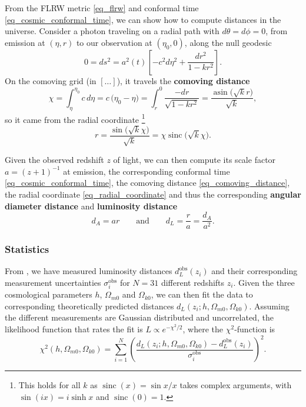 \documentclass[10pt,a4paper]{article}
\DeclareMathOperator{\asin}{asin}
\DeclareMathOperator{\sinc}{sinc}
\begin{document}
From the FLRW metric \eqref{eq_flrw} and conformal time \eqref{eq_cosmic_conformal_time},
we can show how to compute distances in the universe.
Consider a photon traveling on a radial path with $d\theta = d\phi = 0$,
from emission at $(\eta,r)$ to our observation at $(\eta_0, 0)$,
along the null geodesic
\begin{equation*}
	0 = ds^2 = a^2(t) \left[ -c^2 d\eta^2 + \frac{dr^2}{1-kr^2} \right].
\end{equation*}
On the comoving grid (in $[\ldots]$), it travels the \textbf{comoving distance}
\begin{equation}
	\chi = \int_{\eta}^{\eta_0} c \, d\eta = c \, \big(\eta_0 - \eta\big) = \int_r^0 \frac{-dr}{\sqrt{1-kr^2}} = \frac{\asin\big(\sqrt{k}r\big)}{\sqrt{k}},
\label{eq_comoving_distance}
\end{equation}
so it came from the radial coordinate%
\footnote{This holds for all $k$ as $\sinc(x) = \sin x / x$ takes complex arguments, with $\sin(ix) = i \sinh x$ and $\sinc(0) = 1$.}
\begin{equation}
	r = \frac{\sin\Big(\sqrt{k}\chi\Big)}{\sqrt{k}} = \chi \sinc\Big(\sqrt{k}\chi\Big).
\label{eq_radial_coordinate}
\end{equation}

Given the observed redshift $z$ of light,
we can then compute its scale factor $a = (z+1)^{-1}$ at emission,
the corresponding conformal time \eqref{eq_cosmic_conformal_time},
the comoving distance \eqref{eq_comoving_distance}, the radial coordinate \eqref{eq_radial_coordinate}
and thus the corresponding \textbf{angular diameter distance} and \textbf{luminosity distance}
\begin{equation}
	d_A = a r
	\qquad \text{and} \qquad
	d_L = \frac{r}{a} = \frac{d_A}{a^2}.
\label{eq_distances}
\end{equation}

\subsubsection*{Statistics}

From \cite{betouleImprovedCosmologicalConstraints2014},
we have measured luminosity distances $d_{L}^\text{obs}(z_i)$ and their
corresponding measurement uncertainties $\sigma_i^\text{obs}$
for $N=31$ different redshifts $z_i$.
Given the three cosmological parameters $h$, $\Omega_{m0}$ and $\Omega_{k0}$,
we can then fit the data to corresponding theoretically predicted distances $d_L(z_i; h, \Omega_{m0}, \Omega_{k0})$.
Assuming the different measurements are Gaussian distributed and uncorrelated,
the likelihood function that rates the fit is $L \propto e^{-\chi^2/2}$, where the $\chi^2$-function is
\begin{equation}
	\chi^2(h,\Omega_{m0},\Omega_{k0}) = \sum_{i=1}^{N} \left( \frac{d_L(z_i; h, \Omega_{m0}, \Omega_{k0}) - d_{L}^\text{obs}(z_i)}{\sigma_i^\text{obs}} \right)^2.
\label{eq_chi2}
\end{equation}
\end{document}
